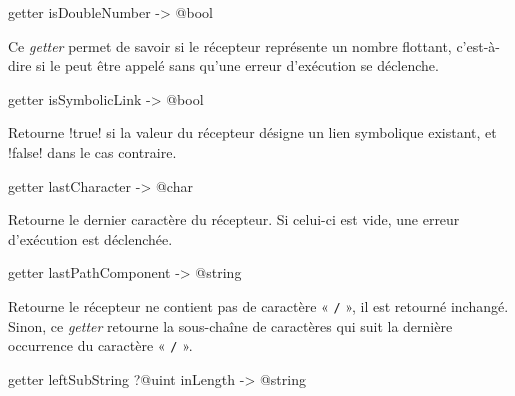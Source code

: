
\begin{galgasbox}
getter isDoubleNumber -> @bool
\end{galgasbox}

Ce \emph{getter} permet de savoir si le récepteur représente un nombre flottant, c'est-à-dire si le  peut être appelé sans qu'une erreur d'exécution se déclenche.








\begin{galgasbox}
getter isSymbolicLink -> @bool
\end{galgasbox}

Retourne \ggs!true! si la valeur du récepteur désigne un lien symbolique existant, et \ggs!false! dans le cas contraire.









\begin{galgasbox}
getter lastCharacter -> @char
\end{galgasbox}

Retourne le dernier caractère du récepteur. Si celui-ci est vide, une erreur d'exécution est déclenchée.









\begin{galgasbox}
getter lastPathComponent -> @string
\end{galgasbox}

Retourne le récepteur ne contient pas de caractère « \texttt{/} », il est retourné inchangé. Sinon, ce \emph{getter} retourne la sous-chaîne de caractères qui suit la dernière occurrence du caractère « \texttt{/} ».









\begin{galgasbox}
getter leftSubString ?@uint inLength -> @string
\end{galgasbox}

